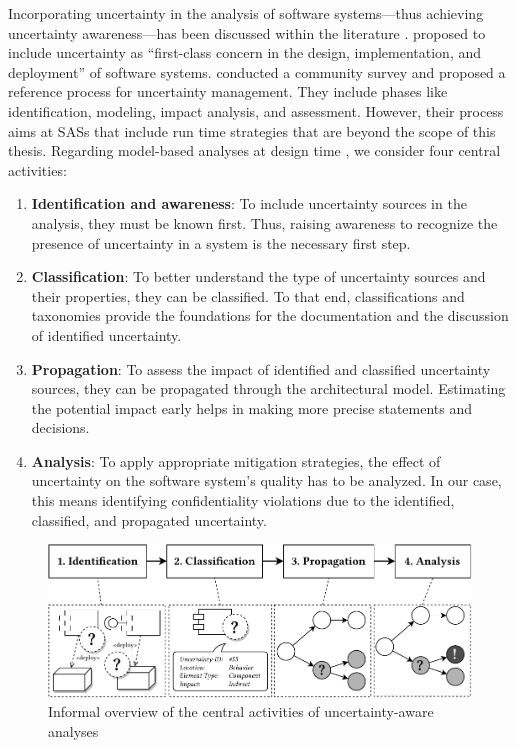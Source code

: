 Incorporating uncertainty in the analysis of software systems---thus achieving uncertainty awareness---has been discussed within the literature \cite{garlan_software_2010,sobhy_evaluation_2021,troya_uncertainty_2021}.
\textcite{garlan_software_2010} proposed to include uncertainty as \enquote{first-class concern in the design, implementation, and deployment} of software systems.
\textcite{hezavehi_uncertainty_2021} conducted a community survey and proposed a reference process for uncertainty management.
They include phases like identification, modeling, impact analysis, and assessment.
However, their process aims at \acfp{SAS} that include run time strategies that are beyond the scope of this thesis.
Regarding model-based analyses at design time \cite{acosta_uncertainty_2022}, we consider four central activities: 

\begin{enumerate}
    \item \textbf{Identification and awareness}: 
    To include uncertainty sources in the analysis, they must be known first.
    Thus, raising awareness to recognize the presence of uncertainty in a system is the necessary first step.

    \item \textbf{Classification}: 
    To better understand the type of uncertainty sources and their properties, they can be classified.
    To that end, classifications and taxonomies provide the foundations for the documentation and the discussion of identified uncertainty.

    \item \textbf{Propagation}: To assess the impact of identified and classified uncertainty sources, they can be propagated through the architectural model.
    Estimating the potential impact early helps in making more precise statements and decisions.

    \item \textbf{Analysis}: To apply appropriate mitigation strategies, the effect of uncertainty on the software system's quality has to be analyzed.
    In our case, this means identifying confidentiality violations due to the identified, classified, and propagated uncertainty.
\end{enumerate}

\begin{figure}
    \centering
    \includegraphics[width=\textwidth]{figures/chapter4/overview-informal.pdf}
    \caption{Informal overview of the central activities of uncertainty-aware analyses}
    \label{fig:overview:informal}
\end{figure}


